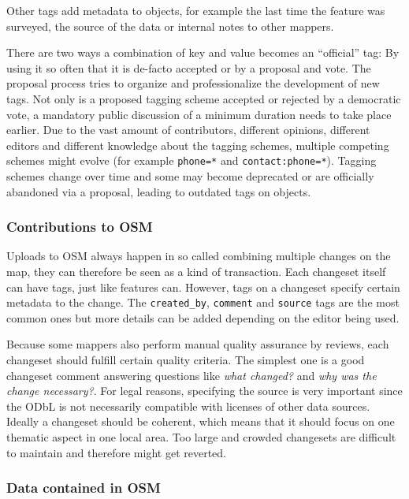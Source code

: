			Other tags add metadata to objects, for example the last time the feature was surveyed, the source of the data or internal notes to other mappers.
			
			There are two ways a combination of key and value becomes an \enquote{official} tag:
			By using it so often that it is de-facto accepted or by a proposal and vote.
			The proposal process tries to organize and professionalize the development of new tags.
			Not only is a proposed tagging scheme accepted or rejected by a democratic vote, a mandatory public discussion of a minimum duration needs to take place earlier.
			Due to the vast amount of contributors, different opinions, different editors and different knowledge about the tagging schemes, multiple competing schemes might evolve (for example \texttt{phone=*} and \texttt{contact:phone=*}).
			Tagging schemes change over time and some may become deprecated or are officially abandoned via a proposal, leading to outdated tags on objects.
			
		\subsubsection{Contributions to OSM}
		
			Uploads to OSM always happen in so called  combining multiple changes on the map\cite{osm-wiki-changeset}, they can therefore be seen as a kind of transaction.
			Each changeset itself can have tags, just like features can.
			However, tags on a changeset specify certain metadata to the change.
			The \texttt{created\_by}, \texttt{comment} and \texttt{source} tags are the most common ones but more details can be added depending on the editor being used.
			
			Because some mappers also perform manual quality assurance by reviews, each changeset should fulfill certain quality criteria.
			The simplest one is a good changeset comment answering questions like \textit{what changed?} and \textit{why was the change necessary?}.
			For legal reasons, specifying the source is very important since the ODbL is not necessarily compatible with licenses of other data sources.
			Ideally a changeset should be coherent, which means that it should focus on one thematic aspect in one local area.
			Too large and crowded changesets are difficult to maintain and therefore might get reverted.
			
		\subsubsection{Data contained in OSM}
		
